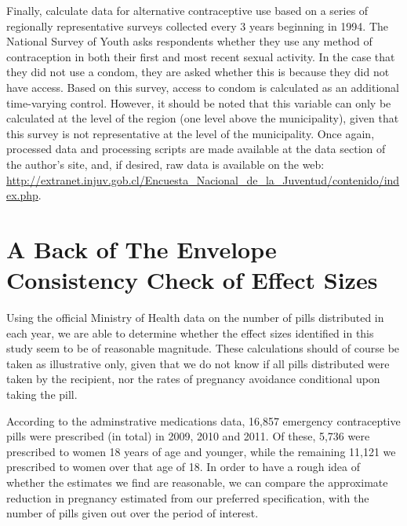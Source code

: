 Finally, \person calculate data for alternative contraceptive use based on
a series of regionally representative surveys collected every 3 years beginning
in 1994.  The National Survey of Youth asks respondents whether they use any 
method of contraception in both their first and most recent sexual activity.  
In the case that they did not use a condom, they are asked whether this is 
because they did not have access.  Based on this survey, access to condom is
calculated as an additional time-varying control.  However, it should be noted
that this variable can only be calculated at the level of the region (one 
level above the municipality), given that this survey is not representative at 
the level of the municipality.  Once again, processed data and processing 
scripts are made available at the data section of the author's site, and, if 
desired, raw data is available on the web: 
\url{http://extranet.injuv.gob.cl/Encuesta_Nacional_de_la_Juventud/contenido/index.php}.

\section{A Back of The Envelope Consistency Check of Effect Sizes}
\label{TEENscn:BOE}
Using the official Ministry of Health data on the number of pills distributed
in each year, we are able to determine whether the effect sizes identified in
this study seem to be of reasonable magnitude.  These calculations should of
course be taken as illustrative only, given that we do not know if all pills
distributed were taken by the recipient, nor the rates of pregnancy avoidance
conditional upon taking the pill.

According to the adminstrative medications data, 16,857 emergency 
contraceptive pills were prescribed (in total) in 2009, 2010 and 2011. Of 
these, 5,736 were prescribed to women 18 years of age and younger, while the
remaining 11,121 we prescribed to women over that age of 18.  In order to have
a rough idea of whether the estimates we find are reasonable, we can compare
the approximate reduction in pregnancy estimated from our preferred 
specification, with the number of pills given out over the period of interest.

